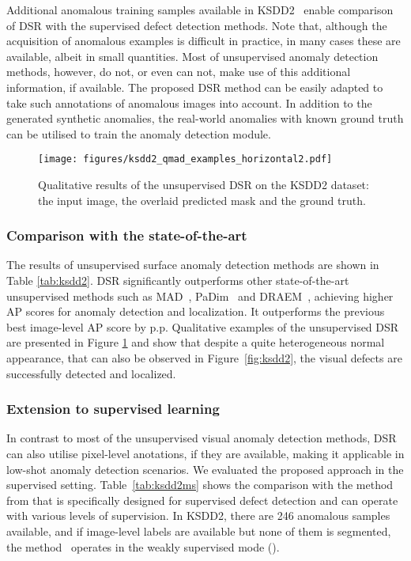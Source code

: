 \documentclass[runningheads]{llncs}
\begin{document}
Additional anomalous training samples available in KSDD2~\cite{bovzivc2021mixed} enable comparison of DSR with the supervised defect detection methods. Note that, although the acquisition of anomalous examples is difficult in practice, in many cases these are available, albeit in small quantities. Most of unsupervised anomaly detection methods, however, do not, or even can not, make use of this additional information, if available. The proposed DSR method can be easily adapted to take such annotations of anomalous images into account. In addition to the generated synthetic anomalies, the real-world anomalies with known ground truth can be utilised to train the anomaly detection module.

\begin{figure}
\centering
  \texttt{[image: figures/ksdd2\_qmad\_examples\_horizontal2.pdf]}
\caption{Qualitative results of the unsupervised DSR on the KSDD2 dataset: the input image, the overlaid predicted mask and the ground truth.
}
\label{fig:ksdd2_DSR_ex}
\end{figure}

\subsubsection{Comparison with the state-of-the-art}


The results of unsupervised surface anomaly detection methods are shown in Table \ref{tab:ksdd2}.
DSR significantly outperforms other state-of-the-art unsupervised methods such as MAD~\cite{featspace2}, PaDim~\cite{defard2021padim} and DRAEM~\cite{zavrtanik2021draem}, achieving higher AP scores for anomaly detection and localization. It outperforms the previous best image-level AP score by  p.p. Qualitative examples of the unsupervised DSR are presented in Figure \ref{fig:ksdd2_DSR_ex} and show that despite a quite heterogeneous normal appearance, that can also be observed in Figure~\ref{fig:ksdd2}, the visual defects are successfully detected and localized.

\subsubsection{Extension to supervised learning}

In contrast to most of the unsupervised visual anomaly detection methods, DSR can also utilise pixel-level anotations, if they are available, making it applicable in low-shot anomaly detection scenarios. We evaluated the proposed approach in the supervised setting. Table~\ref{tab:ksdd2ms} shows the comparison with the method from \cite{bovzivc2021mixed} that is specifically designed for supervised defect detection and can operate with various levels of supervision. In KSDD2, there are 246 anomalous samples available, and if image-level labels are available but none of them is segmented, the method~\cite{bovzivc2021mixed} operates in the weakly supervised mode (). 
\end{document}
